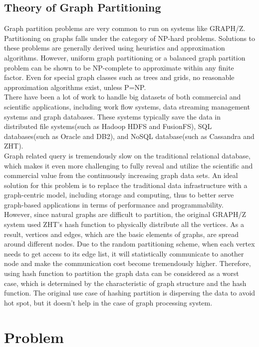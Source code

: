 \documentclass[10pt]{article}
\begin{document}
\begin{multicols}{2}
  \subsection{Theory of Graph Partitioning}
  Graph partition problems are very common to run on systems like GRAPH/Z. Partitioning on graphs falls under the category of NP-hard problems. Solutions to these problems are generally derived using heuristics and approximation algorithms. However, uniform graph partitioning or a balanced graph partition problem can be shown to be NP-complete to approximate within any finite factor. Even for special graph classes such as trees and grids, no reasonable approximation algorithms exist, unless P=NP.\\
  There have been a lot of work to handle big datasets of both commercial and scientific applications, including work flow systems, data streaming management systems and graph databases. These systems typically save the data in distributed file systems(such as Hadoop HDFS and FusionFS), SQL databases(such as Oracle and DB2), and NoSQL database(such as Cassandra and ZHT).\\
  Graph related query is tremendously slow on the traditional relational database, which makes it even more challenging to fully reveal and utilize the scientific and commercial value from the continuously increasing graph data sets. An ideal solution for this problem is to replace the traditional data infrastructure with a graph-centric model, including storage and computing, thus to better serve graph-based applications in terms of performance and programmability.\\
  However, since natural graphs are difficult to partition, the original GRAPH/Z system used ZHT’s hash function to physically distribute all the vertices. As a result, vertices and edges, which are the basic elements of graphs, are spread around different nodes. Due to the random partitioning scheme, when each vertex needs to get access to its edge list, it will statistically communicate to another node and make the communication cost become tremendously higher. Therefore, using hash function to partition the graph data can be considered as a worst case, which is determined by the characteristic of graph structure and the hash function. The original use case of hashing partition is dispersing the data to avoid hot spot, but it doesn’t help in the case of graph processing system.
  
  \section{Problem}

\end{multicols}
\end{document}
